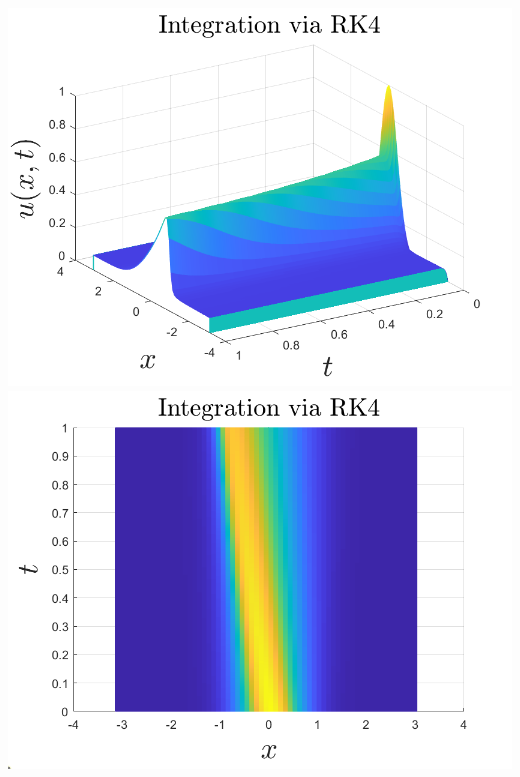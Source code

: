\documentclass{article}
\begin{document}
\begin{center}
    \includegraphics[scale = 0.35]{burgereqRK4}
    \includegraphics[scale = 0.35]{burgereqRK4TOPVIEW}
\end{center}
\end{document}
